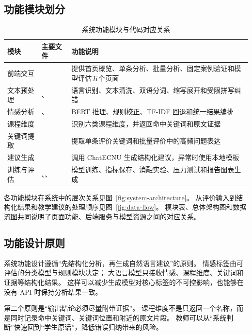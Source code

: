 \subsection{功能模块划分}

\begin{table}[H]
  \centering
  \caption{系统功能模块与代码对应关系}
  \label{tab:function-modules}
  \small
  \begin{tabularx}{\textwidth}{C{2.7cm} L{3.5cm} Y}
    \toprule
    模块 & 主要文件 & 功能说明 \\
    \midrule
    前端交互 &  &
    提供首页概览、单条分析、批量分析、固定案例验证和模型评估五个页面 \\
    文本预处理 & 、 &
    语言识别、文本清洗、双语分词、缩写展开和受限拼写纠错 \\
    情感分析 & 、 &
    BERT 推理、规则校正、TF-IDF 回退和统一结果编排 \\
    课程维度 &  &
    识别六类课程维度，并返回命中关键词和原文证据 \\
    关键词提取 &  &
    提取单条评价关键词和批量评价中的高频问题表达 \\
    建议生成 &  &
    调用 ChatECNU 生成结构化建议，异常时使用本地模板 \\
    训练与评估 & 、、 &
    模型训练、指标保存、消融实验、压力测试和报告图表生成 \\
    \bottomrule
  \end{tabularx}
\end{table}

各功能模块在系统中的层次关系见图~\ref{fig:system-architecture}。
从评价输入到结构化结果和教学建议的处理顺序见图~\ref{fig:data-flow}。
模块表、总体架构图和数据流图共同说明了页面功能、后端服务与模型资源之间的对应关系。

\subsection{功能设计原则}

系统功能设计遵循“先结构化分析，再生成自然语言建议”的原则。
情感标签由可评估的分类模型与规则模块决定；
大语言模型只接收情感、课程维度、关键词和证据等结构化结果。
这样可以减少生成模型对核心标签的不可控影响，也能够在没有 API 时保持分析结果一致。

第二个原则是“输出结论必须尽量附带证据”。
课程维度不是只返回一个名称，而是同时记录命中关键词、关键词位置和附近的原文片段。
教师可以从“系统判断”快速回到“学生原话”，降低错误归纳带来的风险。
